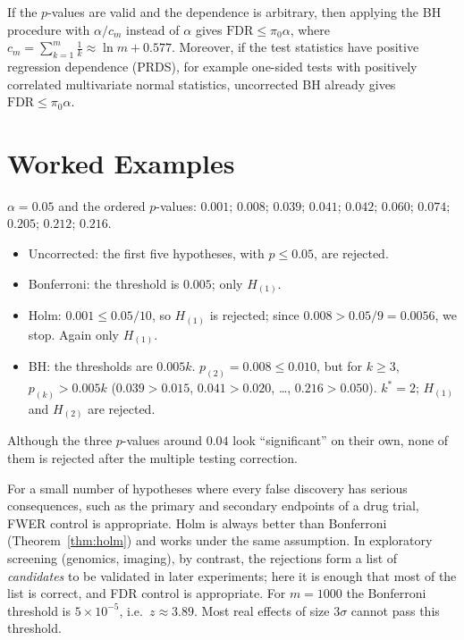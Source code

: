 \documentclass[main.tex]{subfiles}
\begin{document}
\begin{theorem}\label{thm:by}
If the $p$-values are valid and the dependence is arbitrary, then applying the BH procedure with $\alpha/c_m$ instead of $\alpha$ gives $\mathrm{FDR}\le\pi_0\alpha$, where $c_m=\sum_{k=1}^m\frac1k\approx\ln m+0.577$. Moreover, if the test statistics have positive regression dependence (PRDS), for example one-sided tests with positively correlated multivariate normal statistics, uncorrected BH already gives $\mathrm{FDR}\le\pi_0\alpha$.
\end{theorem}

\section{Worked Examples}

\begin{example}\label{ex:on-p}
$\alpha=0.05$ and the ordered $p$-values: $0.001$; $0.008$; $0.039$; $0.041$; $0.042$; $0.060$; $0.074$; $0.205$; $0.212$; $0.216$.
\begin{itemize}
  \item Uncorrected: the first five hypotheses, with $p\le0.05$, are rejected.
  \item Bonferroni: the threshold is $0.005$; only $H_{(1)}$.
  \item Holm: $0.001\le0.05/10$, so $H_{(1)}$ is rejected; since $0.008>0.05/9=0.0056$, we stop. Again only $H_{(1)}$.
  \item BH: the thresholds are $0.005k$. $p_{(2)}=0.008\le0.010$, but for $k\ge3$, $p_{(k)}>0.005k$ ($0.039>0.015$, $0.041>0.020$, \ldots, $0.216>0.050$). $k^*=2$; $H_{(1)}$ and $H_{(2)}$ are rejected.
\end{itemize}
Although the three $p$-values around $0.04$ look ``significant'' on their own, none of them is rejected after the multiple testing correction.
\end{example}

\begin{example}\label{ex:hangisi}
For a small number of hypotheses where every false discovery has serious consequences, such as the primary and secondary endpoints of a drug trial, FWER control is appropriate. Holm is always better than Bonferroni (Theorem~\ref{thm:holm}) and works under the same assumption. In exploratory screening (genomics, imaging), by contrast, the rejections form a list of \emph{candidates} to be validated in later experiments; here it is enough that most of the list is correct, and FDR control is appropriate. For $m=1000$ the Bonferroni threshold is $5\times10^{-5}$, i.e.\ $z\approx3.89$. Most real effects of size $3\sigma$ cannot pass this threshold.
\end{example}
\end{document}
